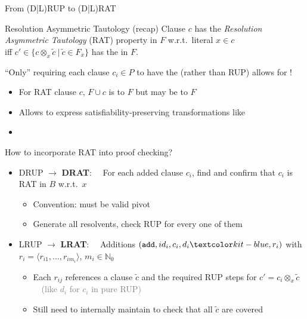 \documentclass[t,english]{sdqbeamer}
\begin{document}
\begin{frame}{From (D|L)RUP to (D|L)RAT~\cite{heule2016drat}}
	
	\vspace*{-3mm}
	\begin{blueblock}{Resolution Asymmetric Tautology \textcolor{gray!50}{(recap)}}
		Clause $c$ has the \emph{Resolution Asymmetric Tautology} (RAT) property in $F$ w.r.t.\ literal $x \in c$\\
		iff  $c' \in \{c \otimes_x \tilde{c}\ |\ \tilde{c} \in F_{\overline{x}} \}$ has the  in $F$.
	\end{blueblock}
	\vspace*{1mm}
	\pause
	``Only'' requiring each clause $c_i \in P$ to have the  (rather than RUP) allows for !
	\begin{itemize}
		\item For RAT clause $c$, $F \cup c$ is  to $F$ but may be  to $F$
		\item Allows to express satisfiability-preserving transformations like 
		\item {}
	\end{itemize}
	\vspace*{1mm}
	\pause
	How to incorporate RAT into proof checking?
	\vspace*{1mm}
	\begin{itemize}
		\item DRUP $\rightarrow$ \textbf{DRAT}: \ \ For each added clause $c_i$, find  and confirm that $c_i$ is RAT in $B$ w.r.t.\ $x$
		\begin{itemize}
			\item Convention:  must be valid pivot
			\item Generate all resolvents, check RUP for every one of them
		\end{itemize}
		\pause
		\vspace*{1mm}
		\item LRUP $\rightarrow$ \textbf{LRAT}: \ \ Additions $(\texttt{add}, id_i, c_i, d_i\highl{, r_i})$ with $r_i = \langle r_{i1}, \ldots, r_{im_i} \rangle$, $m_i \in \mathbb{N}_0$
		\begin{itemize}
			\item Each $r_{ij}$ references a clause $\tilde{c}$ and the required RUP steps for $c' = c_i \otimes_x \tilde{c}$\ \ \textcolor{gray}{(like $d_i$ for $c_i$ in pure RUP)}
			\item Still need to internally maintain  to check that all $\tilde{c}$ are covered
		\end{itemize}
	\end{itemize}
\end{frame}
\end{document}
